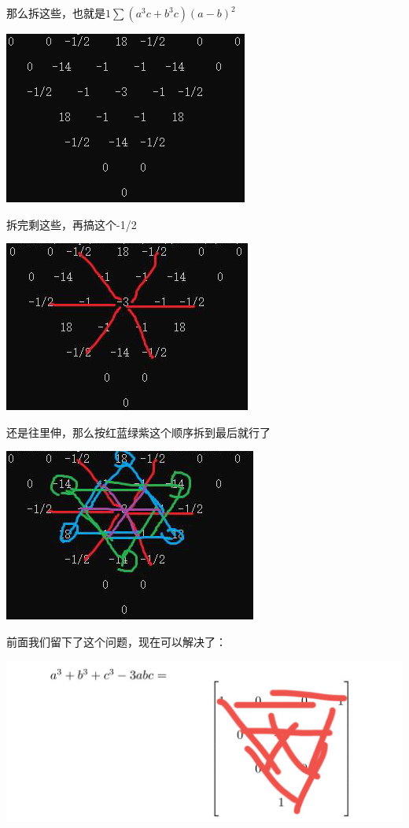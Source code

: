 \documentclass[UTF8]{ctexart}
\begin{document}
那么拆这些，也就是$ 1\displaystyle \sum (a^3c+b^3c)(a-b)^2 $
\begin{center}
	\includegraphics[width=0.5\linewidth]{0386}
\end{center}
拆完剩这些，再搞这个-1/2
\begin{center}
	\includegraphics[width=0.5\linewidth]{0387}
\end{center}
还是往里伸，那么按红蓝绿紫这个顺序拆到最后就行了
\begin{center}
	\includegraphics[width=0.5\linewidth]{0388}
\end{center}
\pageref{1}\label{2}前面我们留下了这个问题，现在可以解决了：
\begin{center}
	\includegraphics[width=0.7\linewidth]{0390}
\end{center}
\end{document}
